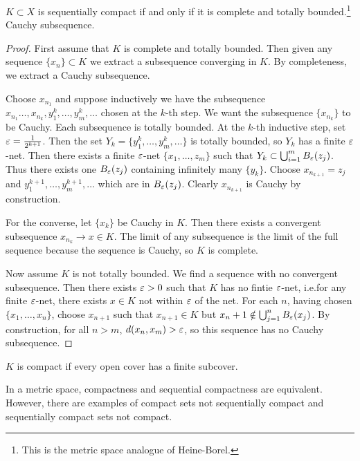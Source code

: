\documentclass[10pt, twoside]{article}
\begin{document}
    \begin{thm}
        $K \subset X$ is sequentially compact if and only if it is complete and totally bounded.\footnote{This is the metric space analogue of Heine-Borel.} Cauchy subsequence.
        \begin{proof}
            First assume that $K$ is complete and totally bounded. Then given any sequence $\{x_n\} \subset K$ we extract a subsequence converging in $K$. By completeness, we extract a Cauchy subsequence. 
            
            Choose $x_{n_1}$ and suppose inductively we have the subsequence $x_{n_1} \ldots, x_{n_k}, y_1^k, \ldots, y_m^k, \ldots$ chosen at the $k$-th step. We want the subsequence $\{x_{n_k}\}$ to be Cauchy. Each subsequence is totally bounded. At the $k$-th inductive step, set $\varepsilon = \frac{1}{2^{k+1}}$. Then the set $Y_k = \{y_1^k, \ldots, y_m^k, \ldots\}$ is totally bounded, so $Y_k$ has a finite $\varepsilon$-net. Then there exists a finite $\varepsilon$-net $\{x_1, \ldots, z_m\}$ such that $Y_k \subset \bigcup_{i=1}^m B_{\varepsilon}(z_j)$. Thus there exists one $B_{\varepsilon}(z_j)$ containing infinitely many $\{y_k\}$. Choose $x_{n_{k+1}} = z_j$ and $y_1^{k+1}, \ldots, y_m^{k+1}, \ldots$ which are in $B_{\varepsilon}(z_j)$. Clearly $x_{n_{k+1}}$ is Cauchy by construction.

            For the converse, let $\{x_k\}$ be Cauchy in $K$. Then there exists a convergent subsequence $x_{n_k} \rightarrow x \in K$. The limit of any subsequence is the limit of the full sequence because the sequence is Cauchy, so $K$ is complete.

            Now assume $K$ is not totally bounded. We find a sequence with no convergent subsequence. Then there exists $\varepsilon > 0$ such that $K$ has no fintie $\varepsilon$-net, i.e.for any finite $\varepsilon$-net, there exists $x \in K$ not within $\varepsilon$ of the net. For each $n$, having chosen $\{x_1, \ldots, x_n\}$, choose $x_{n+1}$ such that $x_{n+1} \in K$ but $x_n+1 \notin \bigcup_{j=1}^n B_{\varepsilon}(x_j)$. By construction, for all $n > m$, $d(x_n, x_m)  >\varepsilon$, so this sequence has no Cauchy subsequence.
        \end{proof}
    \end{thm}

    \begin{defn}
        $K$ is compact if every open cover has a finite subcover.
    \end{defn}

    In a metric space, compactness and sequential compactness are equivalent. However, there are examples of compact sets not sequentially compact and sequentially compact sets not compact.
\end{document}
